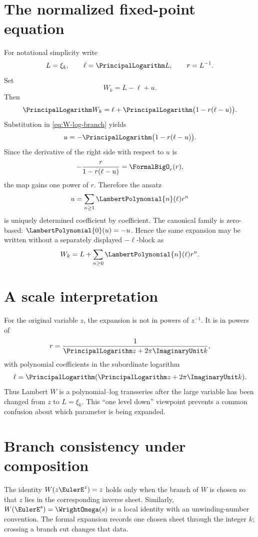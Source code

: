 \documentclass[11pt,openany]{book}
\theoremstyle{definition}
\theoremstyle{plain}
\theoremstyle{remark}
\begin{document}
\section{The normalized fixed-point equation}
For notational simplicity write
\[
 L=\xi_k,
 \qquad \ell=\PrincipalLogarithm L,
 \qquad r=L^{-1}.
\]
Set
\begin{equation}\label{eq:W-normalized}
 W_k=L-\ell+u.
\end{equation}
Then
\[
 \PrincipalLogarithm W_k
 =\ell+\PrincipalLogarithm\bigl(1-r(\ell-u)\bigr).
\]
Substitution in \cref{eq:W-log-branch} yields
\begin{equation}\label{eq:W-fixed-point}
 u=-\PrincipalLogarithm\bigl(1-r(\ell-u)\bigr).
\end{equation}
Since the derivative of the right side with respect to \(u\) is
\begin{equation}\label{eq:W-contraction-factor}
 -\frac{r}{1-r(\ell-u)}=\FormalBigO_r(r),
\end{equation}
the map gains one power of \(r\). Therefore the ansatz
\begin{equation}\label{eq:W-Pn-ansatz}
 u=\sum_{n\ge1}\LambertPolynomial{n}(\ell)r^n
\end{equation}
is uniquely determined coefficient by coefficient.
The canonical family is zero-based: \(\LambertPolynomial{0}(u)=-u\).  Hence
the same expansion may be written without a separately displayed
\(-\ell\)-block as
\[
 W_k=L+\sum_{n\ge0}\LambertPolynomial{n}(\ell)r^n.
\]

\section{A scale interpretation}
For the original variable \(z\), the expansion is not in powers of \(z^{-1}\). It is in powers of
\[
 r=\frac1{\PrincipalLogarithm z+2\pi\ImaginaryUnit k},
\]
with polynomial coefficients in the subordinate logarithm
\[
 \ell=\PrincipalLogarithm(\PrincipalLogarithm z+2\pi\ImaginaryUnit k).
\]
Thus Lambert \(W\) is a polynomial--log transseries after the large variable has been changed from \(z\) to \(L=\xi_k\). This ``one level down'' viewpoint prevents a common confusion about which parameter is being expanded.

\section{Branch consistency under composition}
The identity \(W(z\EulerE^z)=z\) holds only when the branch of \(W\) is chosen so that \(z\) lies in the corresponding inverse sheet. Similarly, \(W(\EulerE^s)=\WrightOmega(s)\) is a local identity with an unwinding-number convention. The formal expansion records one chosen sheet through the integer \(k\); crossing a branch cut changes that data.
\end{document}

